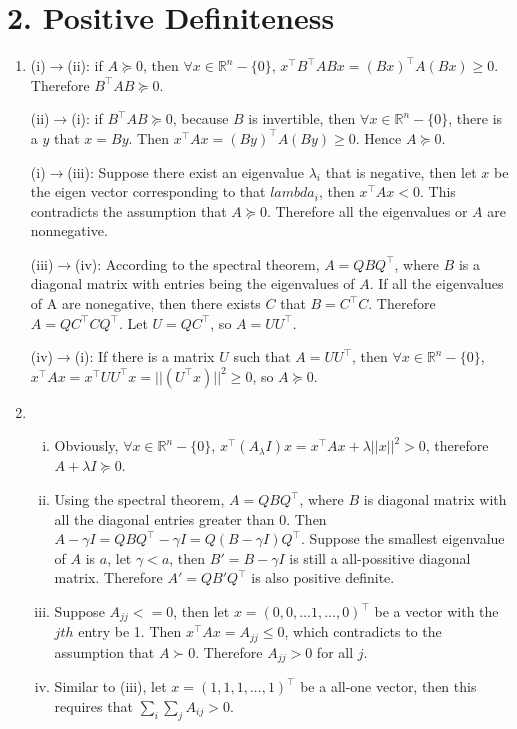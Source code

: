 \documentclass[11pt]{article}
\newenvironment{qparts}{\begin{enumerate}[{(}a{)}]}{\end{enumerate}}
\begin{document}
\section*{2. Positive Definiteness}
\begin{qparts}
\item
(i)$\rightarrow$(ii): if $A\succeq 0$, then $\forall x \in \mathbb{R}^n-\{0\}$, $x^\top B^\top AB x = (Bx)^\top A(Bx) \geq 0$. Therefore $B^\top AB \succeq 0$.

(ii)$\rightarrow$(i): if $B^\top AB \succeq 0$, because $B$ is invertible, then $\forall x \in \mathbb{R}^n-\{0\}$, there is a $y$ that $x=By$. Then $x^\top Ax = (By)^\top A(By) \geq 0$. Hence $A\succeq 0$.

(i)$\rightarrow$(iii): Suppose there exist an eigenvalue $\lambda_i$ that is negative, then let $x$ be the eigen vector corresponding to that $lambda_i$, then $x^\top Ax<0$. This contradicts the assumption that $A\succeq 0$. Therefore all the eigenvalues or $A$ are nonnegative.

(iii)$\rightarrow$(iv): According to the spectral theorem, $A=QBQ^\top$, where $B$ is a diagonal matrix with entries being the eigenvalues of $A$. If all the eigenvalues of A are nonegative, then there exists $C$ that $B=C^\top C$. Therefore $A=QC^\top CQ^\top$. Let $U=QC^\top$, so $A=UU^\top$.

(iv)$\rightarrow$(i): If there is a matrix $U$ such that $A=UU^\top$, then $\forall x \in \mathbb{R}^n-\{0\}$, $x^\top Ax = x^\top UU^\top x = ||(U^\top x)||^2 \geq 0$, so $A\succeq 0$.

\item
\begin{enumerate}[i) ]
	\item Obviously, $\forall x \in \mathbb{R}^n-\{0\}$, $x^\top (A_\lambda I)x = x^\top Ax + \lambda ||x||^2 > 0$, therefore $A+\lambda I \succeq 0$.
	
	\item Using the spectral theorem, $A=QBQ^\top$, where $B$ is diagonal matrix with all the diagonal entries greater than 0. Then $A-\gamma I = QBQ^\top -\gamma I = Q(B-\gamma I)Q^\top$. Suppose the smallest eigenvalue of $A$ is $a$, let $\gamma <a$, then $B'=B-\gamma I$ is still a all-possitive diagonal matrix. Therefore $A'=QB'Q^\top$ is also positive definite.
	
	\item Suppose $A_{jj}<=0$, then let $x=(0, 0, ...1, ..., 0)^\top$ be a vector with the $jth$ entry be 1. Then $x^\top Ax = A_{jj} \leq 0$, which contradicts to the assumption that $A\succ 0$. Therefore $A_{jj} >0$ for all $j$.
	
	\item Similar to (iii), let $x=(1, 1, 1, ..., 1)^\top$ be a all-one vector, then this requires that $\sum_i\sum_j A_{ij} >0$.
	
\end{enumerate}

\end{qparts}
\end{document}
